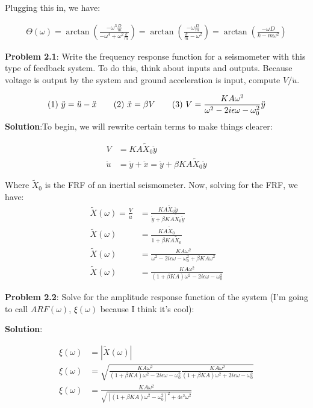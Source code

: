 \documentclass{article} %
\newcommand{\question}[2][]{\begin{flushleft}
        \textbf{Problem #1}: #2
\end{flushleft}}
\newcommand{\sol}{\textbf{Solution}:} %
\begin{document}
Plugging this in, we have:

\begin{align*}
        \Theta(\omega) = \arctan\left(\frac{-\omega^3\frac{D}{m}}{-\omega^4+\omega^2\frac{k}{m}}\right) = \arctan\left(\frac{-\omega\frac{D}{m}}{\frac{k}{m}-\omega^2}\right) = \arctan\left(\frac{-\omega D}{k-m\omega^2}\right)
\end{align*}

\newpage
\question[2.1]{Write the frequency response function for a seismometer with this type of feedback system. To do this, think about inputs and outputs. Because voltage is output by the system and ground acceleration is input, compute $V/\ddot{u}$.}
\[(1)\text{\space}\ddot{y} = \ddot{u}-\ddot{x}\quad\quad (2)\text{\space}\ddot{x}=\beta V\quad\quad (3)\text{\space}V=\frac{KA\omega^2}{\omega^2-2i\epsilon\omega-\omega^2_0}\ddot{y}\]
\sol \space To begin, we will rewrite certain terms to make things clearer:

\begin{align*}
        V &= KA\tilde{X}_0\ddot{y}\\
        \ddot{u} &= \ddot{y}+\ddot{x} = \ddot{y}+\beta KA\tilde{X}_0\ddot{y}
\end{align*}

\noindent Where $\tilde{X}_0$ is the FRF of an inertial seismometer. Now, solving for the FRF, we have:
\begin{align*}
        \tilde{X}(\omega) = \frac{V}{\ddot{u}} &= \frac{KA\tilde{X}_0\ddot{y}}{\ddot{y}+\beta KA\tilde{X}_0\ddot{y}} \\
        \tilde{X}(\omega) &= \frac{KA\tilde{X}_0}{1+\beta KA\tilde{X}_0}\\
        \tilde{X}(\omega) &= \frac{KA\omega^2}{\omega^2-2i\epsilon\omega-\omega_0^2+\beta KA\omega^2}\\
        \tilde{X}(\omega) &= \frac{KA\omega^2}{(1+\beta KA)\omega^2 - 2i\epsilon\omega - \omega_0^2}
\end{align*}

\question[2.2]{Solve for the amplitude response function of the system (I'm going to call $ARF(\omega)$, $\xi(\omega)$ because I think it's cool):}
\sol

\begin{align*}
        \xi(\omega) &= |\tilde{X}(\omega)| \\
        \xi(\omega) &= \sqrt{\frac{KA\omega^2}{(1+\beta KA)\omega^2 - 2i\epsilon\omega - \omega_0^2}\frac{KA\omega^2}{(1+\beta KA)\omega^2 + 2i\epsilon\omega - \omega_0^2}} \\
        \xi(\omega) &= \frac{KA\omega^2}{\sqrt{\left[(1+\beta KA)\omega^2-\omega_0^2\right]^2+4\epsilon^2\omega^2}}
\end{align*}
\end{document}
